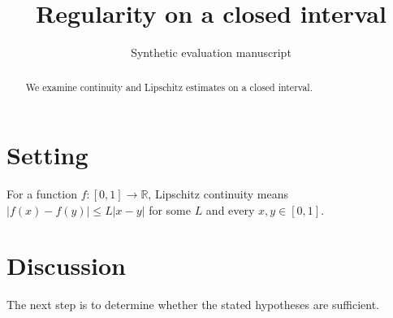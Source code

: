 \documentclass[11pt]{article}
\title{Regularity on a closed interval}
\author{Synthetic evaluation manuscript}
\newcommand{\f}{f}
\begin{document}
\maketitle
\begin{abstract}
We examine continuity and Lipschitz estimates on a closed interval.
\end{abstract}
\section{Setting}
For a function $\f:[0,1]\to\mathbb R$, Lipschitz continuity means
$|\f(x)-\f(y)|\le L|x-y|$ for some $L$ and every $x,y\in[0,1]$.

\section{Discussion}
The next step is to determine whether the stated hypotheses are sufficient.
\end{document}
